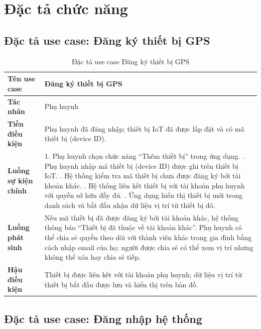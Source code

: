 \documentclass[../DoAn.tex]{subfiles}
\begin{document}
\section{Đặc tả chức năng}
\label{section:2.3}

\subsection{Đặc tả use case: Đăng ký thiết bị GPS}

\begin{table}[H]
\centering
\caption{Đặc tả use case Đăng ký thiết bị GPS}
\label{table:uc_device}
\begin{tabular}{|l|p{9.5cm}|}
\hline
\textbf{Tên use case}       & Đăng ký thiết bị GPS \\
\hline
\textbf{Tác nhân}           & Phụ huynh \\
\hline
\textbf{Tiền điều kiện}     & Phụ huynh đã đăng nhập; thiết bị IoT đã được lắp đặt và có mã thiết bị (device ID). \\
\hline
\textbf{Luồng sự kiện chính} &
1. Phụ huynh chọn chức năng ``Thêm thiết bị'' trong ứng dụng. \newline
2. Phụ huynh nhập mã thiết bị (device ID) được ghi trên thiết bị IoT. \newline
3. Hệ thống kiểm tra mã thiết bị chưa được đăng ký bởi tài khoản khác. \newline
4. Hệ thống liên kết thiết bị với tài khoản phụ huynh với quyền sở hữu đầy đủ. \newline
5. Ứng dụng hiển thị thiết bị mới trong danh sách và bắt đầu nhận dữ liệu vị trí từ thiết bị đó. \\
\hline
\textbf{Luồng phát sinh}    & Nếu mã thiết bị đã được đăng ký bởi tài khoản khác, hệ thống thông báo ``Thiết bị đã thuộc về tài khoản khác''. Phụ huynh có thể chia sẻ quyền theo dõi với thành viên khác trong gia đình bằng cách nhập email của họ; người được chia sẻ có thể xem vị trí nhưng không thể xóa hay chia sẻ tiếp. \\
\hline
\textbf{Hậu điều kiện}      & Thiết bị được liên kết với tài khoản phụ huynh; dữ liệu vị trí từ thiết bị bắt đầu được lưu và hiển thị trên bản đồ. \\
\hline
\end{tabular}
\end{table}

\subsection{Đặc tả use case: Đăng nhập hệ thống}
\end{document}
